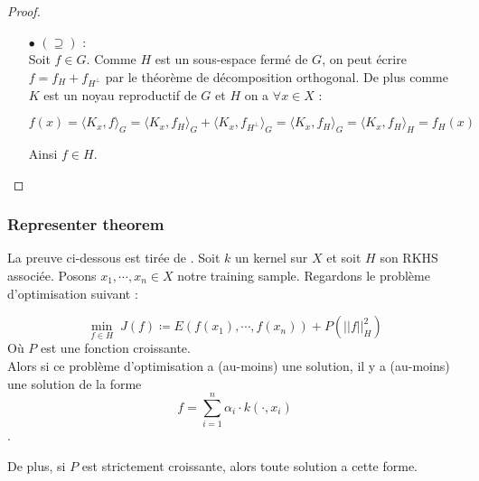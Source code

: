 \documentclass[a4paper, 11pt, french]{article}
\theoremstyle{definition}
\begin{document}
\begin{proof}
\begin{itemize}
		\item[$\bullet$]
		$(\supseteq)$ : \\
		Soit $f \in G$. Comme $H$ est un sous-espace fermé de $G$, on peut écrire $f = f_{H} + f_{H^\perp}$ par le théorème de décomposition orthogonal. De plus comme $K$ est un noyau reproductif de $G$ et $H$ on a $\forall x \in X$ :
		
		\[f(x) = \langle K_x, f \rangle_G = \langle K_x, f_{H} \rangle_G + \langle K_x, f_{H^\perp} \rangle_G = \langle K_x, f_{H} \rangle_G = \langle K_x, f_{H} \rangle_H = f_H (x) \]
		
		Ainsi $f \in H$.
	\end{itemize}	
\end{proof}
	
\subsubsection{Representer theorem}

	La preuve ci-dessous est tirée de \cite{eecs}.
	Soit $k$ un kernel sur $X$ et soit $H$ son RKHS associée. Posons $x_1, \cdots, x_n \in X$ notre training sample. Regardons le problème d'optimisation suivant :
	
	\[\min_{f \in H} \; J(f) \coloneqq E(f(x_1), \cdots, f(x_n)) + P(||f||_H^2)\]
	Où $P$ est une fonction croissante. \\
	
	Alors si ce problème d'optimisation a (au-moins) une solution, il y a (au-moins) une solution de la forme \[f = \sum_{i=1}^{n} \alpha_i \cdot k(\cdot, x_i)\].
	
	De plus, si $P$ est strictement croissante, alors toute solution a cette forme.
	
\end{document}
